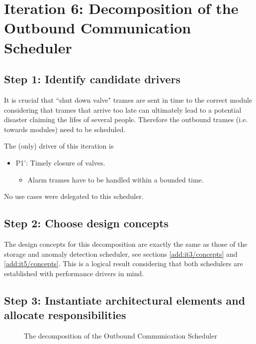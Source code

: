 \section{Iteration 6: Decomposition of the Outbound Communication Scheduler}
\label{add:it6}

\subsection{Step 1: Identify candidate drivers}
\label{add:it6/drivers}

\npar It is crucial that ``shut down valve" trames are sent in time to the
correct module considering that trames that arrive too late can ultimately
lead to a potential disaster claiming the lifes of several people. Therefore the
outbound trames (i.e. towards modules) need to be scheduled. 

\npar The (only) driver of this iteration is 

\begin{itemize}
  	\item P1': Timely closure of valves.
  	\begin{itemize}
  		\item Alarm trames have to be handled within a bounded time. 
    \end{itemize}
\end{itemize}

\npar No use cases were delegated to this scheduler.

\subsection{Step 2: Choose design concepts}
\label{add:it6/concepts}

\npar The design concepts for this decomposition are exactly the same as those
of the storage and anomaly detection scheduler, see sections
\ref{add:it3/concepts} and \ref{add:it5/concepts}.
This is a logical result considering that both schedulers are established with
performance drivers in mind.

\subsection{Step 3: Instantiate architectural elements and allocate responsibilities}
\label{add:it6/elements}

\begin{figure}[H]
	\begin{centering}
		\caption{The decomposition of the Outbound Communication Scheduler}
		\label{fig:add/it6/decomposition}
	\end{centering}
\end{figure}

